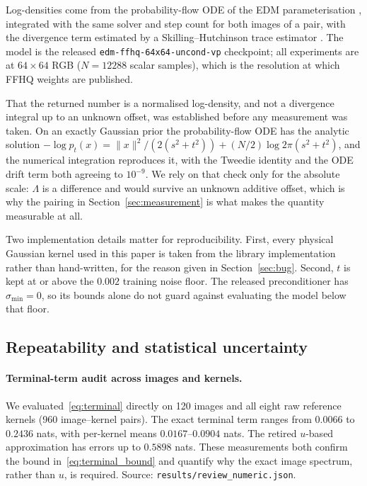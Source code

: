 \documentclass[10pt,journal]{IEEEtran}
\newcommand{\Lam}{\Lambda}
\begin{document}
Log-densities come from the probability-flow ODE of the EDM parameterisation
\cite{karras2022edm}, integrated with the same solver and step count for both
images of a pair, with the divergence term estimated by a Skilling--Hutchinson trace estimator
\cite{skilling1989eigenvalues,hutchinson1990stochastic}. The model is the released \texttt{edm-ffhq-64x64-uncond-vp}
checkpoint; all experiments are at $64\times64$ RGB ($N=12288$ scalar samples), which is the
resolution at which FFHQ weights are published.

That the returned number is a normalised log-density, and not a divergence integral up to an
unknown offset, was established before any measurement was taken. On an exactly Gaussian prior
the probability-flow ODE has the analytic solution
$-\log p_t(x)=\|x\|^2/(2(s^2+t^2))+(N/2)\log 2\pi(s^2+t^2)$, and the numerical integration
reproduces it, with the Tweedie identity and the ODE drift term both agreeing to $10^{-9}$. We
rely on that check only for the absolute scale: $\Lam$ is a difference and would survive an
unknown additive offset, which is why the pairing in Section~\ref{sec:measurement} is what
makes the quantity measurable at all.

Two implementation details matter for reproducibility. First, every physical Gaussian kernel
used in this paper is taken from the library implementation rather than hand-written, for the
reason given in Section~\ref{sec:bug}. Second, $t$ is kept at or above the $0.002$ training
noise floor. The released preconditioner has $\sigma_{\min}=0$, so its bounds alone do not
guard against evaluating the model below that floor.

\subsection{Repeatability and statistical uncertainty}
\label{sec:uncertainty}

\paragraph*{Terminal-term audit across images and kernels.}
We evaluated~\eqref{eq:terminal} directly on 120 images and all eight raw reference kernels
(960 image--kernel pairs). The exact terminal term ranges from $0.0066$ to $0.2436$ nats,
with per-kernel means $0.0167$--$0.0904$ nats. The retired $u$-based approximation has errors
up to $0.5898$ nats. These measurements both confirm the bound in~\eqref{eq:terminal_bound}
and quantify why the exact image spectrum, rather than $u$, is required. Source:
\texttt{results/review\_numeric.json}.
\end{document}
